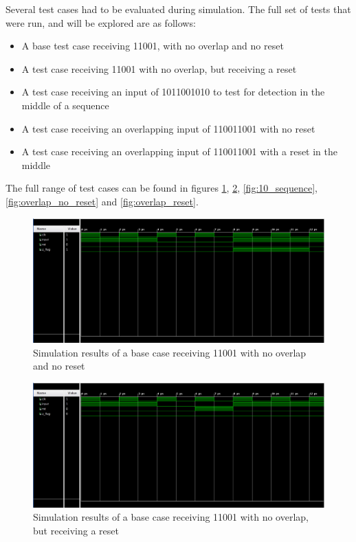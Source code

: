 \documentclass[12pt,a4paper]{article}
\begin{document}
Several test cases had to be evaluated during simulation. The full set of tests that were run, and will be explored are as follows:

\begin{itemize}
    \item A base test case receiving 11001, with no overlap and no reset
    \item A test case receiving 11001 with no overlap, but receiving a reset
    \item A test case receiving an input of 1011001010 to test for detection in the middle of a sequence
    \item A test case receiving an overlapping input of 110011001 with no reset
    \item A test case receiving an overlapping input of 110011001 with a reset in the middle
\end{itemize}

The full range of test cases can be found in figures \ref{fig:no_overlap_no_reset}, \ref{fig:no_overlap_reset}, \ref{fig:10_sequence}, \ref{fig:overlap_no_reset} and  \ref{fig:overlap_reset}.

\begin{figure}[H]
    \centering
    \includegraphics[scale=0.25]{images/no_overlap_no_reset.png}
    \caption{Simulation results of a base case receiving 11001 with no overlap and no reset}
    \label{fig:no_overlap_no_reset}
\end{figure}

\begin{figure}[H]
    \centering
    \includegraphics[scale=0.25]{images/no_overlap_reset.png}
    \caption{Simulation results of a base case receiving 11001 with no overlap, but receiving a reset}
    \label{fig:no_overlap_reset}
\end{figure}
\end{document}
